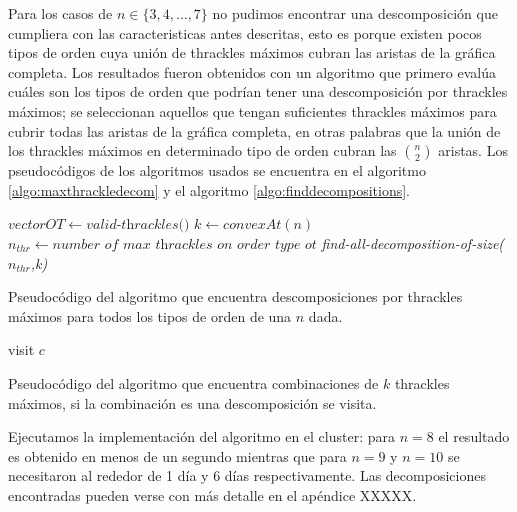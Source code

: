 Para los casos de $n \in \{3,4,\dots,7\}$ no pudimos encontrar una descomposición que cumpliera
con las caracteristicas antes descritas, esto es porque existen pocos tipos de orden
cuya unión de thrackles máximos cubran las aristas de la gráfica completa.
Los resultados fueron obtenidos con un algoritmo que primero evalúa
cuáles son los tipos de orden que podrían tener una descomposición por thrackles máximos;
se seleccionan aquellos que tengan suficientes thrackles máximos para cubrir todas las
aristas de la gráfica completa, en otras palabras que la unión de los thrackles
máximos en determinado tipo de orden cubran las $\binom{n}{2}$ aristas. Los pseudocódigos
de los algoritmos usados se encuentra en el algoritmo \ref{algo:maxthrackledecom} y
el algoritmo \ref{algo:finddecompositions}.

\begin{algorithm}[h!]
  \begin{algorithmic}[1]
    \State $vectorOT \gets \textit{valid-thrackles()}$
    \State $k \gets convexAt(n)$
        \State $n_{thr} \gets \textit{number of max thrackles on order type ot}$
        \State \textit{find-all-decomposition-of-size($n_{thr}$,k)}
    \EndFor
    \EndProcedure
  \end{algorithmic}
  \caption{Pseudocódigo del algoritmo que encuentra descomposiciones por thrackles
  máximos para todos los tipos de orden de una $n$ dada.}
  \label{algo:maxthrackledecom}
\end{algorithm}

\begin{algorithm}[h!]
  \begin{algorithmic}[1]
        \State visit $c$
      \EndIf
    \EndWhile
    \EndProcedure
    \caption{Pseudocódigo del algoritmo que encuentra combinaciones de $k$ thrackles
    máximos, si la combinación es una descomposición se visita.}
    \label{algo:finddecompositions}
  \end{algorithmic}
\end{algorithm}

Ejecutamos la implementación del algoritmo en el cluster:
para $n=8$ el resultado es obtenido en menos de un segundo mientras que para
$n=9$ y $n=10$ se necesitaron al rededor de 1 día y 6 días respectivamente.
Las decomposiciones encontradas pueden verse con más detalle en el apéndice XXXXX.

